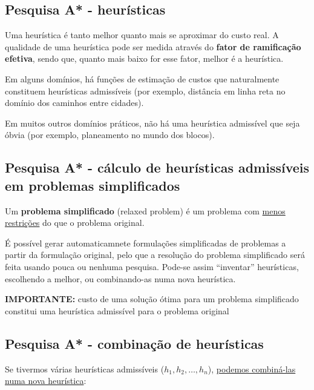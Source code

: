 \documentclass{article}
\begin{document}
\subsection{Pesquisa A* - heurísticas}

Uma heurística é tanto melhor quanto mais se
aproximar do custo real. A qualidade de uma heurística
pode ser medida através do \textbf{fator de ramificação efetiva}, sendo que,
quanto mais baixo for esse fator, melhor é a heurística.

\vspace{2mm}

Em alguns domínios, há funções de estimação de
custos que naturalmente constituem heurísticas
admissíveis (por exemplo, distância em linha reta
no domínio dos caminhos entre cidades).

\vspace{2mm}

Em muitos outros domínios práticos, não há uma
heurística admissível que seja óbvia (por exemplo, planeamento
no mundo dos blocos).

\pagebreak

\subsection{Pesquisa A* - cálculo de heurísticas
admissíveis em problemas simplificados}

Um \textbf{problema simplificado} (relaxed problem) é um
problema com \uline{menos restrições} do que o problema
original.

\vspace{2mm}

É possível gerar automaticamnete formulações simplificadas de problemas
a partir da formulação original, pelo que a resolução do problema simplificado será feita usando
pouca ou nenhuma pesquisa. Pode-se assim “inventar” heurísticas, escolhendo a melhor,
ou combinando-as numa nova heurística.

\begin{flushleft}
  \textbf{IMPORTANTE:}  custo de uma solução ótima para
  um problema simplificado constitui uma heurística
  admissível para o problema original
\end{flushleft}

\subsection{Pesquisa A* - combinação de heurísticas}

Se tivermos várias heurísticas admissíveis ($h_1, h_2, \dots, h_n$), \uline{podemos
combiná-las numa nova heurística}:
\end{document}
